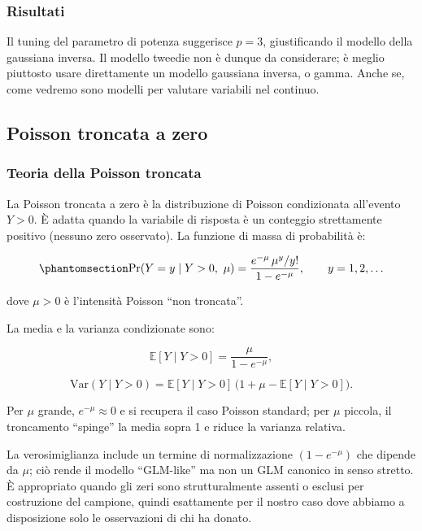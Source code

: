 \documentclass[
  italian,
  a4paper,
  a4paper,
  twoside,
  open=right,
  12pt]{scrbook}
\theoremstyle{definition}
\theoremstyle{remark}
\begin{document}
\subsubsection{Risultati}\label{risultati-1}

Il tuning del parametro di potenza suggerisce \(p = 3\), giustificando
il modello della gaussiana inversa. Il modello tweedie non è dunque da
considerare; è meglio piuttosto usare direttamente un modello gaussiana
inversa, o gamma. Anche se, come vedremo sono modelli per valutare
variabili nel continuo.

\subsection{Poisson troncata a zero}\label{poisson-troncata-a-zero}

\subsubsection{Teoria della Poisson
troncata}\label{teoria-della-poisson-troncata}

La Poisson troncata a zero è la distribuzione di Poisson condizionata
all'evento \(Y>0\). È adatta quando la variabile di risposta è un
conteggio strettamente positivo (nessuno zero osservato). La funzione di
massa di probabilità è:

\begin{equation}\phantomsection\label{eq-poisson_trunc}{
\Pr(Y=y \mid Y>0,\ \mu) = \frac{e^{-\mu}\,\mu^{y}/y!}{1-e^{-\mu}},
\qquad y=1,2,\dots
}\end{equation}

dove \(\mu>0\) è l'intensità Poisson ``non troncata''.

La media e la varianza condizionate sono:

\[
\mathbb{E}[Y \mid Y>0] = \frac{\mu}{1-e^{-\mu}},
\]

\[
\mathrm{Var}(Y \mid Y>0) = \mathbb{E}[Y \mid Y>0]\,
\bigl(1+\mu-\mathbb{E}[Y \mid Y>0]\bigr).
\]

Per \(\mu\) grande, \(e^{-\mu}\approx 0\) e si recupera il caso Poisson
standard; per \(\mu\) piccola, il troncamento ``spinge'' la media sopra
1 e riduce la varianza relativa.

La verosimiglianza include un termine di normalizzazione
\((1-e^{-\mu})\) che dipende da \(\mu\); ciò rende il modello
``GLM-like'' ma non un GLM canonico in senso stretto. È appropriato
quando gli zeri sono strutturalmente assenti o esclusi per costruzione
del campione, quindi esattamente per il nostro caso dove abbiamo a
disposizione solo le osservazioni di chi ha donato.
\end{document}
